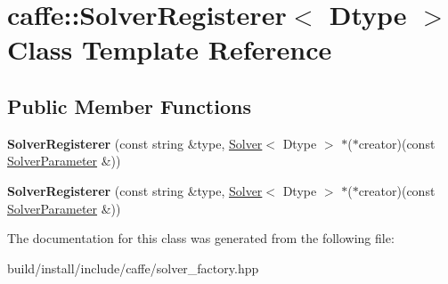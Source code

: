 \hypertarget{classcaffe_1_1_solver_registerer}{}\section{caffe\+:\+:Solver\+Registerer$<$ Dtype $>$ Class Template Reference}
\label{classcaffe_1_1_solver_registerer}
\subsection*{Public Member Functions}
\begin{DoxyCompactItemize}
\item 
\mbox{\label{classcaffe_1_1_solver_registerer_ace7fc4d017af675cbbe49214ca77258b}} 
{\bfseries Solver\+Registerer} (const string \&type, \mbox{\hyperlink{classcaffe_1_1_solver}{Solver}}$<$ Dtype $>$ $\ast$($\ast$creator)(const \mbox{\hyperlink{classcaffe_1_1_solver_parameter}{Solver\+Parameter}} \&))
\item 
\mbox{\label{classcaffe_1_1_solver_registerer_ace7fc4d017af675cbbe49214ca77258b}} 
{\bfseries Solver\+Registerer} (const string \&type, \mbox{\hyperlink{classcaffe_1_1_solver}{Solver}}$<$ Dtype $>$ $\ast$($\ast$creator)(const \mbox{\hyperlink{classcaffe_1_1_solver_parameter}{Solver\+Parameter}} \&))
\end{DoxyCompactItemize}


The documentation for this class was generated from the following file\+:\begin{DoxyCompactItemize}
\item 
build/install/include/caffe/solver\+\_\+factory.\+hpp\end{DoxyCompactItemize}
